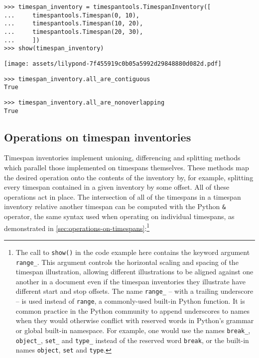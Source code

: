 \begin{abjadbookoutput}
\begin{singlespacing}
\vspace{-0.5\baselineskip}
\begin{verbatim}
>>> timespan_inventory = timespantools.TimespanInventory([
...     timespantools.Timespan(0, 10),
...     timespantools.Timespan(10, 20),
...     timespantools.Timespan(20, 30),
...     ])
>>> show(timespan_inventory)
\end{verbatim}
\noindent\texttt{[image: assets/lilypond-7f455919c0b05a5992d29848880d082d.pdf]}
\begin{verbatim}
>>> timespan_inventory.all_are_contiguous
True
\end{verbatim}
\begin{verbatim}
>>> timespan_inventory.all_are_nonoverlapping
True
\end{verbatim}
\end{singlespacing}
\end{abjadbookoutput}

\subsection{Operations on timespan inventories} %

Timespan inventories implement unioning, differencing and splitting methods
which parallel those implemented on timespans themselves. These methods map the
desired operation onto the contents of the inventory by, for example, splitting
every timespan contained in a given inventory by some offset. All of these
operations act in place. The intersection of all of the timespans in a timespan
inventory relative another timespan can be computed with the Python \texttt{\&}
operator, the same syntax used when operating on individual timespans, as
demonstrated in \autoref{sec:operations-on-timespans}:\footnote{ The call to
\texttt{show()} in the code example here contains the keyword argument
\texttt{range\_}. This argument controls the horizontal scaling and spacing of
the timespan illustration, allowing different illustrations to be aligned
against one another in a document even if the timespan inventories they
illustrate have different start and stop offsets. The name \texttt{range\_} --
with a trailing underscore -- is used instead of \texttt{range}, a
commonly-used built-in Python function. It is common practice in the Python
community to append underscores to names when they would otherwise conflict
with reserved words in Python's grammar or global built-in namespace. For
example, one would use the names \texttt{break\_}, \texttt{object\_},
\texttt{set\_} and \texttt{type\_} instead of the reserved word \texttt{break},
or the built-in names \texttt{object}, \texttt{set} and \texttt{type}.}

